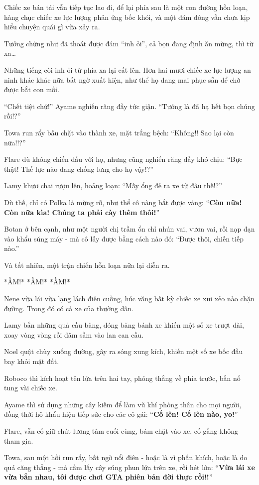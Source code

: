 \documentclass[../main.tex]{subfiles}
\begin{document}
Chiếc xe bán tải vẫn tiếp tục lao đi, để lại phía sau là một con đường hỗn loạn, hàng chục chiếc xe lực lượng phản ứng bốc khói, và một đám đông vẫn chưa kịp hiểu chuyện quái gì vừa xảy ra.

Tưởng chừng như đã thoát được đám ``inh ỏi'', cả bọn đang định ăn mừng, thì từ xa\dots

Những tiếng còi inh ỏi từ phía xa lại cất lên. Hơn hai mươi chiếc xe lực lượng an ninh khác khác nữa bất ngờ xuất hiện, như thể họ đang mai phục sẵn để chờ được bắt con mồi.

``Chết tiệt chứ!'' Ayame nghiến răng đầy tức giận. ``Tưởng là đã hạ hết bọn chúng rồi!?''

Towa run rẩy bấu chặt vào thành xe, mặt trắng bệch: ``Không!! Sao lại còn nữa!!?''

Flare dù không chiến đấu với họ, nhưng cũng nghiến răng đầy khó chịu: ``Bực thật! Thế lực nào đang chống lưng cho họ vậy!?''

Lamy khươ chai rượu lên, hoảng loạn: ``Mấy ổng đẻ ra xe từ đâu thế!?''

Dù thế, chỉ có Polka là mừng rỡ, như thể cô nàng bắt được vàng: ``\textbf{Còn nữa! Còn nữa kìa! Chúng ta phải cày thêm thôi!}''

Botan ở bên cạnh, như một người chị trầm ổn chỉ nhún vai, vươn vai, rồi nạp đạn vào khẩu súng máy - mà cô lấy được bằng cách nào đó: ``Được thôi, chiến tiếp nào.''

Và tất nhiên, một trận chiến hỗn loạn nữa lại diễn ra.

*ẦM!* *ẦM!* *ẦM!*

Nene vừa lái vừa lạng lách điên cuồng, húc văng bất kỳ chiếc xe xui xẻo nào chặn đường. Trong đó có cả xe của thường dân.

Lamy bắn những quả cầu băng, đóng băng bánh xe khiến một số xe trượt dài, xoay vòng vòng rồi đâm sầm vào lan can cầu.

Noel quật chùy xuống đường, gây ra sóng xung kích, khiến một số xe bốc đầu bay khỏi mặt đất.

Roboco thì kích hoạt tên lửa trên hai tay, phóng thẳng về phía trước, bắn nổ tung vài chiếc xe.

Ayame thì sử dụng những cây kiếm để làm vũ khí phòng thân cho mọi người, đồng thời hô khẩu hiệu tiếp sức cho các cô gái: ``\textbf{Cố lên! Cố lên nào, yo!}''

Flare, vẫn cố giữ chút lương tâm cuối cùng, bám chặt vào xe, cố gắng không tham gia.

Towa, sau một hồi run rẩy, bất ngờ nổi điên - hoặc là vì phấn khích, hoặc là do quá căng thẳng - mà cầm lấy cây súng phun lửa trên xe, rồi hét lớn: ``\textbf{Vừa lái xe vừa bắn nhau, tôi được chơi GTA phiên bản đời thực rồi!!}''
\end{document}

